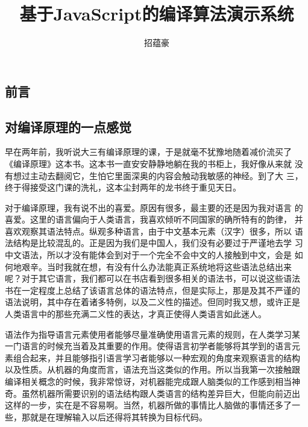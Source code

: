 \documentclass[12pt,leqno]{book}
\begin{document}
\begin{CJK}{UTF8}{gbsn}

\title{\bf{基于JavaScript的编译算法演示系统}}
\author{招蕴豪}
\maketitle
\newpage

\renewcommand{\contentsname}{目录}
\tableofcontents

\chapter*{前言}
\pagestyle{plain}

\section*{对编译原理的一点感觉}
早在两年前，我听说大三有编译原理的课，于是就毫不犹豫地随着减价流买了
《编译原理》这本书。这本书一直安安静静地躺在我的书柜上，我好像从来就
没有想过主动去翻阅它，生怕它里面深奥的内容会触动我敏感的神经。到了大
三，终于得接受这门课的洗礼，这本尘封两年的龙书终于重见天日。

对于编译原理，我有说不出的喜爱。原因有很多，最主要的还是因为我对语言
的喜爱。这里的语言偏向于人类语言，我喜欢倾听不同国家的确所特有的韵律，
并喜欢观察其语法特点。纵观多种语言，由于中文基本元素（汉字）很多，所以
语法结构是比较混乱的。正是因为我们是中国人，我们没有必要过于严谨地去学
习中文语法，所以才没有能体会到对于一个完全不会中文的人接触到中文，会是
如何地艰辛。当时我就在想，有没有什么办法能真正系统地将这些语法总结出来
呢？对于其它语言，我们都可以在书店看到很多相关的语法书，可以说这些语法
书在一定程度上总结了该语言总体的语法特点，但是实际上，那是及其不严谨的
语法说明，其中存在着诸多特例，以及二义性的描述。但同时我又想，或许正是
人类语言中的那些充满二义性的表达，才真正使得人类语言如此迷人。


语法作为指导语言元素使用者能够尽量准确使用语言元素的规则，在人类学习某
一门语言的时候充当着及其重要的作用。使得语言初学者能够将其学到的语言元
素组合起来，并且能够指引语言学习者能够以一种宏观的角度来观察语言的结构
以及性质。从机器的角度而言，语法充当这类似的作用。所以当我第一次接触跟
编译相关概念的时候，我非常惊讶，对机器能完成跟人脑类似的工作感到相当神
奇。虽然机器所需要识别的语法结构跟人类语言的结构差异巨大，但能向前迈出
这样的一步，实在是不容易啊。当然，机器所做的事情比人脑做的事情还多了一
些，那就是在理解输入以后还得将其转换为目标代码。


\end{CJK}
\end{document}
